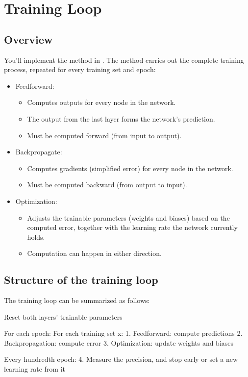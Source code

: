 \section{Training Loop}
\label{c4:sec:training}

\subsection{Overview}
You'll implement the method  in . The method
carries out the complete training process, repeated for every training set and epoch:
\begin{itemize}
  \item Feedforward:
  \begin{itemize}
    \item Computes outputs for every node in the network.
    \item The output from the last layer forms the network's prediction.
    \item Must be computed forward (from input to output).
  \end{itemize}
  \item Backpropagate:
  \begin{itemize}
    \item Computes gradients (simplified error) for every node in the network.
    \item Must be computed backward (from output to input).
  \end{itemize}
  \item Optimization:
  \begin{itemize}
    \item Adjusts the trainable parameters (weights and biases) based on the computed error,
      together with the learning rate the network currently holds.
    \item Computation can happen in either direction.
  \end{itemize}
\end{itemize}

\subsection{Structure of the training loop}
The training loop can be summarized as follows:

\begin{console}
Reset both layers' trainable parameters

For each epoch:
    For each training set x:
        1. Feedforward: compute predictions
        2. Backpropagation: compute error
        3. Optimization: update weights and biases

    Every hundredth epoch:
        4. Measure the precision, and stop early or set a new learning
           rate from it
\end{console}

